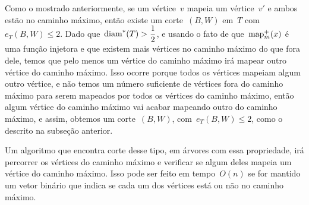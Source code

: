 	Como o mostrado anteriormente, se um vértice~$v$ mapeia um
	vértice~$v'$ e ambos estão no caminho máximo, então existe um
	corte~$(B,W)$ em~$T$ com~${e_T(B,W)\le 2}$.
	Dado que~${\mathrm{diam}^*(T)>\dfrac{1}{2}}$, e usando o fato de 
	que~$\mathrm{map}^+_m(x)$ é uma função injetora e que
	existem mais vértices no caminho máximo do que fora dele,
	temos que pelo menos um vértice do caminho máximo irá mapear
	outro vértice do caminho máximo. Isso ocorre porque todos
	os vértices mapeiam algum outro vértice, e não temos um 
	número suficiente de vértices fora do caminho máximo para serem
	mapeados por todos os vértices do caminho máximo, então algum
	vértice do caminho máximo vai acabar mapeando outro do caminho
	máximo, e assim, obtemos um corte~$(B,W)$, com~$e_T(B,W)\le 2$,
	como o descrito na subseção anterior.

	Um algoritmo que encontra corte desse tipo, em árvores com 
	essa propriedade, irá percorrer os vértices do caminho máximo
	e verificar se algum deles mapeia um vértice do caminho máximo.
	Isso pode ser feito em tempo~$O(n)$ se for mantido um vetor 
	binário que indica se cada um dos vértices está ou não no
	caminho máximo.

